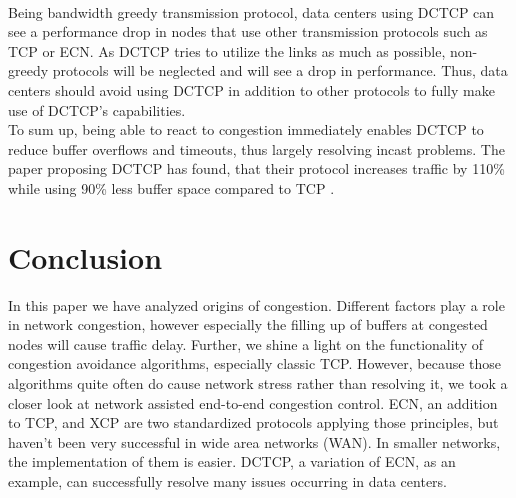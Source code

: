 \documentclass[a4paper,conference]{IEEEtran}
\begin{document}
\\Being bandwidth greedy transmission protocol, data centers using DCTCP can see a performance drop in nodes that use other transmission protocols such as TCP or ECN. As DCTCP tries to utilize the links as much as possible, non-greedy protocols will be neglected and will see a drop in performance. Thus, data centers should avoid using DCTCP in addition to other protocols to fully make use of DCTCP's capabilities.
\\To sum up, being able to react to congestion immediately enables DCTCP to reduce buffer overflows and timeouts, thus largely resolving incast problems. The paper proposing DCTCP has found, that their protocol increases traffic by 110\% while using 90\% less buffer space compared to TCP \cite{10.1145/1851275.1851192}.

\section{Conclusion}
In this paper we have analyzed origins of congestion. Different factors play a role in network congestion, however especially the filling up of buffers at congested nodes will cause traffic delay. Further, we shine a light on the functionality of congestion avoidance algorithms, especially classic TCP. However, because those algorithms quite often do cause network stress rather than resolving it, we took a closer look at network assisted end-to-end congestion control. ECN, an addition to TCP, and XCP are two standardized protocols applying those principles, but haven't been very successful in wide area networks (WAN). In smaller networks, the implementation of them is easier. DCTCP, a variation of ECN, as an example, can successfully resolve many issues occurring in data centers.


\end{document}

